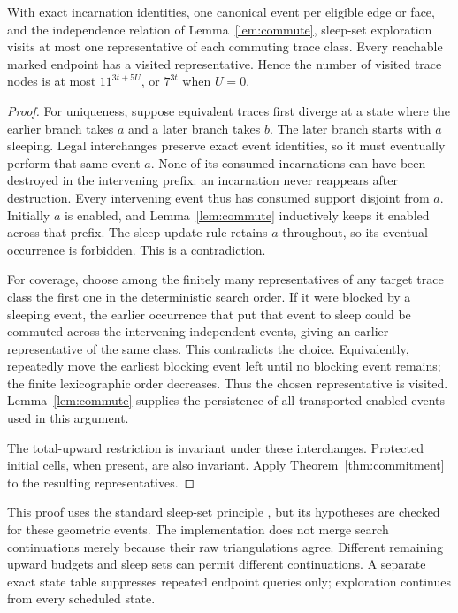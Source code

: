 \begin{theorem}\label{thm:sleep}
With exact incarnation identities, one canonical event per eligible edge or
face, and the independence relation of Lemma~\ref{lem:commute}, sleep-set
exploration visits at most one representative of each commuting trace class.
Every reachable marked endpoint has a visited representative. Hence the
number of visited trace nodes is at most $11^{3t+5U}$, or $7^{3t}$ when $U=0$.
\end{theorem}
\begin{proof}
For uniqueness, suppose equivalent traces first diverge at a state where the
earlier branch takes $a$ and a later branch takes $b$. The later branch starts
with $a$ sleeping. Legal interchanges preserve exact event identities, so it
must eventually perform that same event $a$. None of its consumed
incarnations can have been destroyed in the intervening prefix: an
incarnation never reappears after destruction. Every intervening event thus
has consumed support disjoint from $a$. Initially $a$ is enabled, and
Lemma~\ref{lem:commute} inductively keeps it enabled across that prefix.
The sleep-update rule retains $a$ throughout, so its eventual occurrence is
forbidden. This is a contradiction.

For coverage, choose among the finitely many representatives of any target
trace class the first one in the deterministic search order. If it were
blocked by a sleeping event, the earlier occurrence that put that event to
sleep could be commuted across the intervening independent events, giving
an earlier representative of the same class. This contradicts the choice.
Equivalently, repeatedly move the earliest blocking event left until no
blocking event remains; the finite lexicographic order decreases. Thus
the chosen representative is visited. Lemma~\ref{lem:commute} supplies
the persistence of all transported enabled events used in this argument.

The total-upward restriction is invariant under these interchanges. Protected
initial cells, when present, are also invariant. Apply
Theorem~\ref{thm:commitment} to the resulting representatives.
\end{proof}

This proof uses the standard sleep-set principle \cite{Godefroid}, but its
hypotheses are checked for these geometric events. The implementation does
not merge search continuations merely because their raw triangulations agree.
Different remaining upward budgets and sleep sets can permit different
continuations. A separate exact state table suppresses repeated endpoint
queries only; exploration continues from every scheduled state.

